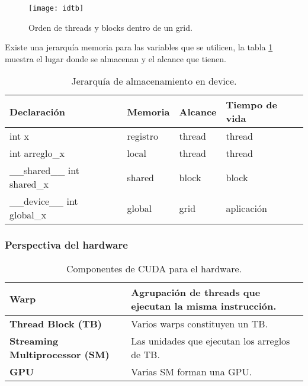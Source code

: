     \begin{figure}[ht]
      \centering
        \texttt{[image: idtb]}
        \caption{Orden de threads y blocks dentro de un grid\cite{CUDAP}.}
        \label{fig:threadOrden}
    \end{figure}
    
    Existe una jerarquía memoria para las variables que se utilicen, la tabla \ref{tab:memoriaCUDA} muestra el lugar donde se almacenan y el alcance que tienen.
    
         \begin{table}[h!]
         \footnotesize
      \begin{center}
        \begin{tabular}{|m{4.6cm}|m{2.6cm}|m{2.6cm}|m{3cm}|}
         \hline
         \cellcolor{lightgray}\textbf{Declaración} & 
         \cellcolor{lightgray}\textbf{Memoria} &
         \cellcolor{lightgray}\textbf{Alcance} &
         \cellcolor{lightgray}\textbf{Tiempo de vida}\\ 
         \hline
        int x & registro & thread & thread\\ 
         \hline
        int arreglo\_x & local & thread & thread\\ 
         \hline
        \_\_shared\_\_ int shared\_x & shared & block & block\\ 
         \hline
        \_\_device\_\_ int global\_x & global & grid & aplicación\\ 
         \hline
           \end{tabular}
        \caption{Jerarquía de almacenamiento en device.}
        \label{tab:memoriaCUDA}
      \end{center}
    \end{table}
    
    \subsubsection{Perspectiva del hardware}
    
     \begin{table}[h!]
      \begin{center}
            \footnotesize
        \begin{tabular}{|m{3cm}|m{6cm}|}
         \hline
         \cellcolor{lightgray}\textbf{Warp} & Agrupación de threads que ejecutan la misma instrucción. \\ 
         \hline
          \cellcolor{lightgray}\textbf{Thread Block (TB)} & Varios warps constituyen un TB.\\ 
         \hline  
         \cellcolor{lightgray}\textbf{Streaming Multiprocessor (SM)} & Las unidades que ejecutan los arreglos de TB.\\ 
         \hline
         \cellcolor{lightgray}\textbf{GPU} & Varias SM forman una GPU.\\ 
         \hline
           \end{tabular}
        \caption{Componentes de CUDA para el hardware.}
        \label{tab:CUDAcompHW}
      \end{center}
    \end{table}
    

